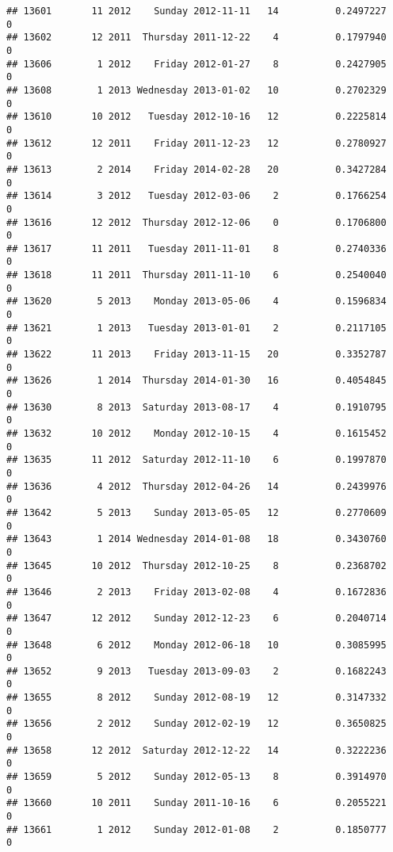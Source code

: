 \documentclass[
]{article}
\begin{document}
\begin{verbatim}
## 13601       11 2012    Sunday 2012-11-11   14          0.2497227             0
## 13602       12 2011  Thursday 2011-12-22    4          0.1797940             0
## 13606        1 2012    Friday 2012-01-27    8          0.2427905             0
## 13608        1 2013 Wednesday 2013-01-02   10          0.2702329             0
## 13610       10 2012   Tuesday 2012-10-16   12          0.2225814             0
## 13612       12 2011    Friday 2011-12-23   12          0.2780927             0
## 13613        2 2014    Friday 2014-02-28   20          0.3427284             0
## 13614        3 2012   Tuesday 2012-03-06    2          0.1766254             0
## 13616       12 2012  Thursday 2012-12-06    0          0.1706800             0
## 13617       11 2011   Tuesday 2011-11-01    8          0.2740336             0
## 13618       11 2011  Thursday 2011-11-10    6          0.2540040             0
## 13620        5 2013    Monday 2013-05-06    4          0.1596834             0
## 13621        1 2013   Tuesday 2013-01-01    2          0.2117105             0
## 13622       11 2013    Friday 2013-11-15   20          0.3352787             0
## 13626        1 2014  Thursday 2014-01-30   16          0.4054845             0
## 13630        8 2013  Saturday 2013-08-17    4          0.1910795             0
## 13632       10 2012    Monday 2012-10-15    4          0.1615452             0
## 13635       11 2012  Saturday 2012-11-10    6          0.1997870             0
## 13636        4 2012  Thursday 2012-04-26   14          0.2439976             0
## 13642        5 2013    Sunday 2013-05-05   12          0.2770609             0
## 13643        1 2014 Wednesday 2014-01-08   18          0.3430760             0
## 13645       10 2012  Thursday 2012-10-25    8          0.2368702             0
## 13646        2 2013    Friday 2013-02-08    4          0.1672836             0
## 13647       12 2012    Sunday 2012-12-23    6          0.2040714             0
## 13648        6 2012    Monday 2012-06-18   10          0.3085995             0
## 13652        9 2013   Tuesday 2013-09-03    2          0.1682243             0
## 13655        8 2012    Sunday 2012-08-19   12          0.3147332             0
## 13656        2 2012    Sunday 2012-02-19   12          0.3650825             0
## 13658       12 2012  Saturday 2012-12-22   14          0.3222236             0
## 13659        5 2012    Sunday 2012-05-13    8          0.3914970             0
## 13660       10 2011    Sunday 2011-10-16    6          0.2055221             0
## 13661        1 2012    Sunday 2012-01-08    2          0.1850777             0

\end{verbatim}
\end{document}
